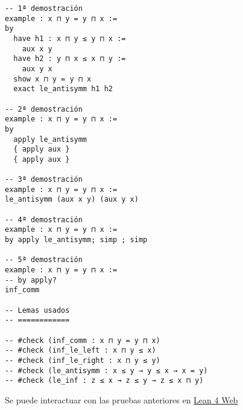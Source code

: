 \begin{verbatim}
-- 1ª demostración
example : x ⊓ y = y ⊓ x :=
by
  have h1 : x ⊓ y ≤ y ⊓ x :=
    aux x y
  have h2 : y ⊓ x ≤ x ⊓ y :=
    aux y x
  show x ⊓ y = y ⊓ x
  exact le_antisymm h1 h2

-- 2ª demostración
example : x ⊓ y = y ⊓ x :=
by
  apply le_antisymm
  { apply aux }
  { apply aux }

-- 3ª demostración
example : x ⊓ y = y ⊓ x :=
le_antisymm (aux x y) (aux y x)

-- 4ª demostración
example : x ⊓ y = y ⊓ x :=
by apply le_antisymm; simp ; simp

-- 5ª demostración
example : x ⊓ y = y ⊓ x :=
-- by apply?
inf_comm

-- Lemas usados
-- ============

-- #check (inf_comm : x ⊓ y = y ⊓ x)
-- #check (inf_le_left : x ⊓ y ≤ x)
-- #check (inf_le_right : x ⊓ y ≤ y)
-- #check (le_antisymm : x ≤ y → y ≤ x → x = y)
-- #check (le_inf : z ≤ x → z ≤ y → z ≤ x ⊓ y)
\end{verbatim}
Se puede interactuar con las pruebas anteriores en \href{https://lean.math.hhu.de/\#url=https://raw.githubusercontent.com/jaalonso/Calculemus2/main/src/Conmutatividad\_del\_infimo.lean}{Lean 4 Web}


